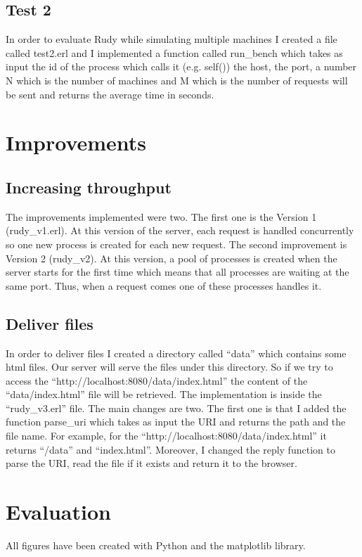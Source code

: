 \documentclass[a4paper, 11pt]{article}
\begin{document}
\subsection{Test 2}
\label{test2}
In order to evaluate Rudy while simulating  multiple machines I created a file called test2.erl and I implemented a function called run\_bench which takes as input the id of the process which calls it (e.g. self())  the host, the port, a number N which is the number of machines and M which is the number of requests will be sent and returns the average time in seconds. 

\section{Improvements}

\subsection{Increasing throughput}
The improvements implemented were two. The first one is the Version 1 (rudy\_v1.erl). At this version of the server, each request is handled concurrently so one new process is created for each new request.
The second improvement is Version 2 (rudy\_v2). At this version, a pool of processes is created when the server starts for the first time which means that all processes are waiting at the same port. Thus, when a request comes one of these processes handles it.

\subsection{Deliver files}
In order to deliver files I created a directory called “data” which contains some html files. Our server will serve the files under this directory. So if we try to access the “http://localhost:8080/data/index.html” the content of the “data/index.html” file will be retrieved. 
The implementation is inside the “rudy\_v3.erl” file. The main changes are two. The first one is that I added the function parse\_uri which takes as input the URI and returns the path and the file name. For example, for the “http://localhost:8080/data/index.html” it returns “/data” and “index.html”. Moreover, I changed the reply function to parse the URI, read the file if it exists and return it to the browser. 


\section{Evaluation}
All figures have been created with Python and the matplotlib library.
\end{document}
